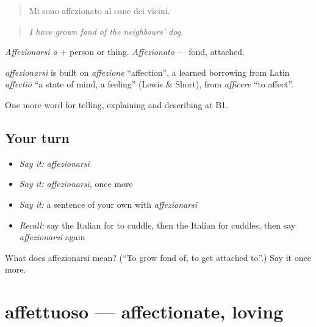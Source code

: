 \begin{quote}
Mi sono affezionato al cane dei vicini.
\end{quote}

\begin{quote}
\emph{I have grown fond of the neighbours' dog.}
\end{quote}

\emph{Affezionarsi a} + person or thing. \emph{Affezionato} — fond, attached.

\begin{cousinweb}
\emph{affezionarsi} is built on \emph{affezione} \textquotedblleft{}affection\textquotedblright{}, a learned borrowing from Latin \emph{affectiō} \textquotedblleft{}a state of mind, a feeling\textquotedblright{} (Lewis \& Short), from \emph{afficere} \textquotedblleft{}to affect\textquotedblright{}.
\end{cousinweb}

\begin{grammarlens}[title={What you've built}]
One more word for telling, explaining and describing at B1.
\end{grammarlens}

\subsection*{Your turn}
\begin{itemize}
\raggedright
  \item \emph{Say it:} \emph{affezionarsi}
  \item \emph{Say it:} \emph{affezionarsi}, once more
  \item \emph{Say it:} a sentence of your own with \emph{affezionarsi}
  \item \emph{Recall:} say the Italian for to cuddle, then the Italian for cuddles, then say \emph{affezionarsi} again
\end{itemize}

\begin{tcolorbox}[breakable,colback=teal!4,colframe=teal!35!black,title={Before you move on}]
What does affezionarsi mean? (\textquotedblleft{}To grow fond of, to get attached to\textquotedblright{}.) Say it once more.
\end{tcolorbox}
\section[affettuoso]{affettuoso — affectionate, loving}

\label{lesson:IT-C492-affettuoso}



